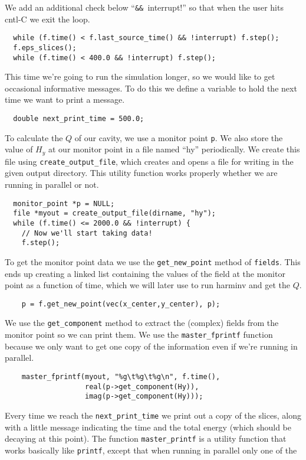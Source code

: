 We add an additional check below ``\verb!&& !interrupt!'' so that when the
user hits cntl-C we exit the loop.
\begin{verbatim}
  while (f.time() < f.last_source_time() && !interrupt) f.step();
  f.eps_slices();
  while (f.time() < 400.0 && !interrupt) f.step();
\end{verbatim}
This time we're going to run the simulation longer, so we would like to get
occasional informative messages.  To do this we define a variable to hold
the next time we want to print a message.
\begin{verbatim}
  double next_print_time = 500.0;
\end{verbatim}
To calculate the $Q$ of our cavity, we use a monitor point \verb!p!.  We
also store the value of $H_y$ at our monitor point in a file named ``hy''
periodically.  We create this file using \verb!create_output_file!, which
creates and opens a file for writing in the given output directory.  This
utility function works properly whether we are running in parallel or not.
\begin{verbatim}
  monitor_point *p = NULL;
  file *myout = create_output_file(dirname, "hy");
  while (f.time() <= 2000.0 && !interrupt) {
    // Now we'll start taking data!
    f.step();
\end{verbatim}
To get the monitor point data we use the \verb!get_new_point! method of
\verb!fields!.  This ends up creating a linked list containing the values
of the field at the monitor point as a function of time, which we will
later use to run harminv and get the $Q$.
\begin{verbatim}
    p = f.get_new_point(vec(x_center,y_center), p);
\end{verbatim}
We use the \verb!get_component! method to extract the (complex) fields from
the monitor point so we can print them.  We use the \verb!master_fprintf!
function because we only want to get one copy of the information even if
we're running in parallel.
\begin{verbatim}
    master_fprintf(myout, "%g\t%g\t%g\n", f.time(),
                   real(p->get_component(Hy)),
                   imag(p->get_component(Hy)));
\end{verbatim}
Every time we reach the \verb!next_print_time! we print out a copy of the
slices, along with a little message indicating the time and the total
energy (which should be decaying at this point).  The function
\verb!master_printf! is a utility function that works basically like
\verb!printf!, except that when running in parallel only one of the
